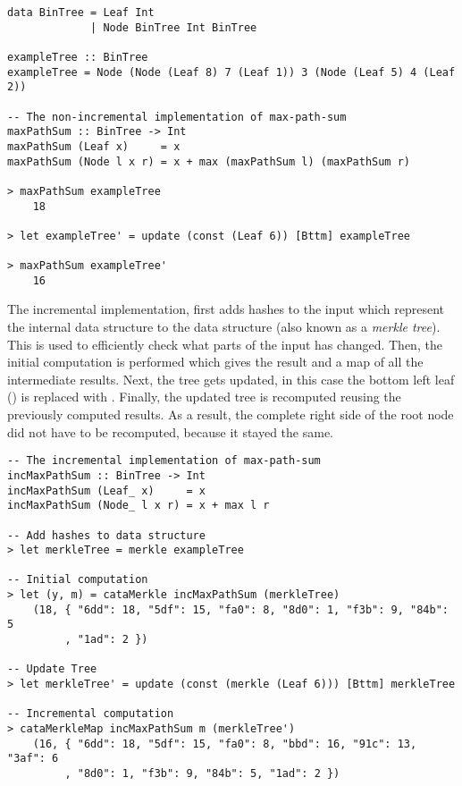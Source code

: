 \begin{verbatim}
data BinTree = Leaf Int
             | Node BinTree Int BinTree 
             
exampleTree :: BinTree    
exampleTree = Node (Node (Leaf 8) 7 (Leaf 1)) 3 (Node (Leaf 5) 4 (Leaf 2))

-- The non-incremental implementation of max-path-sum
maxPathSum :: BinTree -> Int
maxPathSum (Leaf x)     = x
maxPathSum (Node l x r) = x + max (maxPathSum l) (maxPathSum r)

> maxPathSum exampleTree
    18

> let exampleTree' = update (const (Leaf 6)) [Bttm] exampleTree

> maxPathSum exampleTree'
    16
\end{verbatim}

The incremental implementation, first adds hashes to the input which represent the internal data structure to the data structure (also known as a \textit{merkle tree}). This is used to efficiently check what parts of the input has changed. Then, the initial computation is performed which gives the result and a map of all the intermediate results. Next, the tree gets updated, in this case the bottom left leaf () is replaced with . Finally, the updated tree is recomputed reusing the previously computed results. As a result, the complete right side of the root node did not have to be recomputed, because it stayed the same.


\begin{verbatim}
-- The incremental implementation of max-path-sum
incMaxPathSum :: BinTree -> Int
incMaxPathSum (Leaf_ x)     = x
incMaxPathSum (Node_ l x r) = x + max l r

-- Add hashes to data structure
> let merkleTree = merkle exampleTree

-- Initial computation
> let (y, m) = cataMerkle incMaxPathSum (merkleTree)
    (18, { "6dd": 18, "5df": 15, "fa0": 8, "8d0": 1, "f3b": 9, "84b": 5
         , "1ad": 2 })

-- Update Tree
> let merkleTree' = update (const (merkle (Leaf 6))) [Bttm] merkleTree

-- Incremental computation
> cataMerkleMap incMaxPathSum m (merkleTree')
    (16, { "6dd": 18, "5df": 15, "fa0": 8, "bbd": 16, "91c": 13, "3af": 6
         , "8d0": 1, "f3b": 9, "84b": 5, "1ad": 2 })
\end{verbatim}

